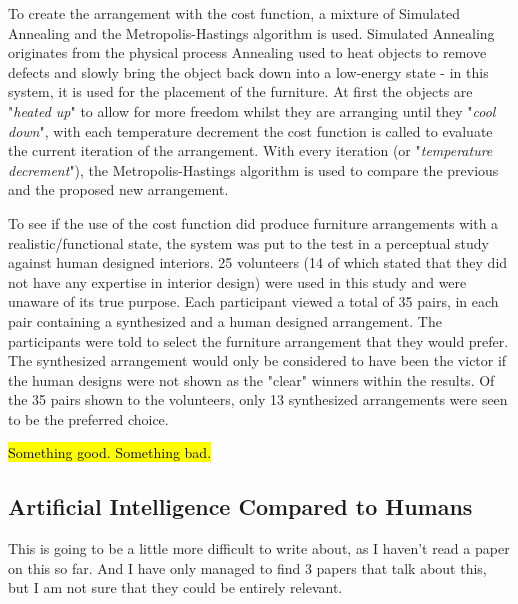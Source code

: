 To create the arrangement with the cost function, a mixture of Simulated Annealing and the Metropolis-Hastings algorithm is used. Simulated Annealing originates from the physical process Annealing used to heat objects to remove defects and slowly bring the object back down into a low-energy state \cite{simulated-annealing} - in this system, it is used for the placement of the furniture. At first the objects are "\textit{heated up}" to allow for more freedom whilst they are arranging until they "\textit{cool down}", with each temperature decrement the cost function is called to evaluate the current iteration of the arrangement. With every iteration (or "\textit{temperature decrement}"), the Metropolis-Hastings algorithm \cite{understanding-mh-algorithm} is used to compare the previous and the proposed new arrangement.


To see if the use of the cost function did produce furniture arrangements with a realistic/functional state, the system was put to the test in a perceptual study against human designed interiors. 25 volunteers (14 of which stated that they did not have any expertise in interior design) were used in this study and were unaware of its true purpose. Each participant viewed a total of 35 pairs, in each pair containing a synthesized and a human designed arrangement. The participants were told to select the furniture arrangement that they would prefer. The synthesized arrangement would only be considered to have been the victor if the human designs were not shown as the "clear" winners within the results. Of the 35 pairs shown to the volunteers, only 13 synthesized arrangements were seen to be the preferred choice.

\hl{Something good. Something bad.}

\bigskip

\subsection{Artificial Intelligence Compared to Humans}
This is going to be a little more difficult to write about, as I haven't read a paper on this so far. And I have only managed to find 3 papers that talk about this, but I am not sure that they could be entirely relevant.